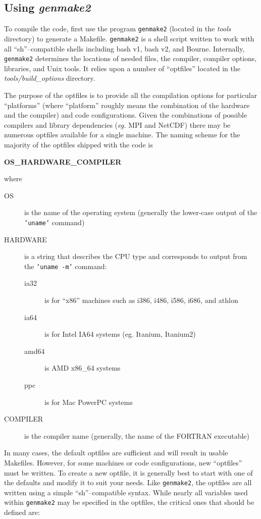 \subsection{Using \textit{genmake2}}
\label{sect:genmake}

To compile the code, first use the program \texttt{genmake2} (located
in the \textit{tools} directory) to generate a Makefile.
\texttt{genmake2} is a shell script written to work with all
``sh''--compatible shells including bash v1, bash v2, and Bourne.
Internally, \texttt{genmake2} determines the locations of needed
files, the compiler, compiler options, libraries, and Unix tools.  It
relies upon a number of ``optfiles'' located in the {\em
  tools/build\_options} directory.

The purpose of the optfiles is to provide all the compilation options
for particular ``platforms'' (where ``platform'' roughly means the
combination of the hardware and the compiler) and code configurations.
Given the combinations of possible compilers and library dependencies
({\it eg.}  MPI and NetCDF) there may be numerous optfiles available
for a single machine.  The naming scheme for the majority of the
optfiles shipped with the code is
\begin{center}
  {\bf OS\_HARDWARE\_COMPILER }
\end{center}
where
\begin{description}
\item[OS] is the name of the operating system (generally the
  lower-case output of the {\tt 'uname'} command)
\item[HARDWARE] is a string that describes the CPU type and
  corresponds to output from the  {\tt 'uname -m'} command:
  \begin{description}
  \item[ia32] is for ``x86'' machines such as i386, i486, i586, i686,
    and athlon
  \item[ia64] is for Intel IA64 systems (eg. Itanium, Itanium2)
  \item[amd64] is AMD x86\_64 systems
  \item[ppc] is for Mac PowerPC systems
  \end{description}
\item[COMPILER] is the compiler name (generally, the name of the
  FORTRAN executable)
\end{description}

In many cases, the default optfiles are sufficient and will result in
usable Makefiles.  However, for some machines or code configurations,
new ``optfiles'' must be written. To create a new optfile, it is
generally best to start with one of the defaults and modify it to suit
your needs.  Like \texttt{genmake2}, the optfiles are all written
using a simple ``sh''--compatible syntax.  While nearly all variables
used within \texttt{genmake2} may be specified in the optfiles, the
critical ones that should be defined are:

